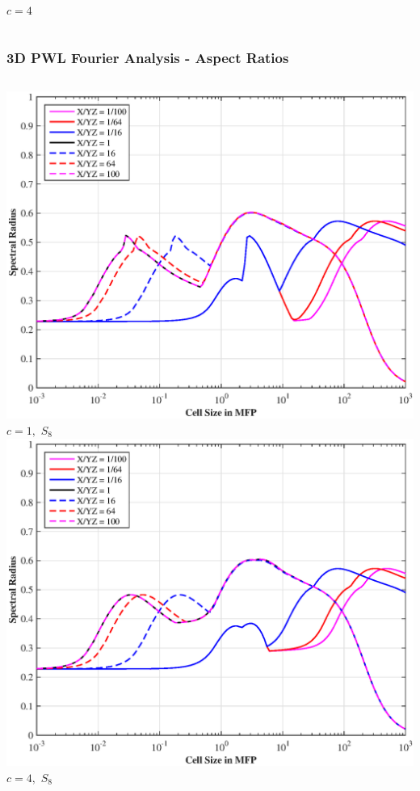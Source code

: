 \documentclass[compress,10pt]{beamer}
\begin{document}
\begin{frame}[t]
{\begin{columns}
$c=4$
\end{columns}
}
{
\frametitle{3D PWL Fourier Analysis - Aspect Ratios}
\vspace{1cm}
\begin{columns}
\centering
\includegraphics[width=\textwidth]{images/SI_MIP_hex_PWLD1_AR1.eps}\\
$c=1,$ $S_8$
\centering
\includegraphics[width=\textwidth]{images/SI_MIP_hex_PWLD1_AR4.eps}\\
$c=4,$ $S_8$
\end{columns}
}

\end{frame}
\end{document}
